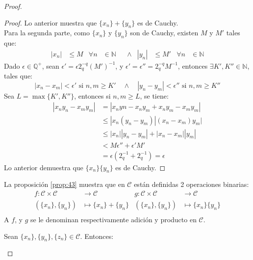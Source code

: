 \begin{proof}
\begin{proof}
  Lo anterior muestra que $\{x_n\} + \{y_n\}$ es de Cauchy.\\
  Para la segunda parte, como $\{x_n\}$ y $\{y_n\}$ son de Cauchy, existen $M$
  y $M'$ tales que:
  \begin{align*}
    |x_n| &\leq M & \forall n &\in \mathbb{N} & &\land & |y_n| &\leq M' &
    \forall n &\in \mathbb{N}
  \end{align*}
  Dado $\epsilon \in \mathbb{Q}^+$, sean $\epsilon' = \epsilon
  2_q^{-q}(M')^{-1}$, y  $\epsilon' = \epsilon''=  2_q^{-q}M^{-1}$, entonces
  $\exists K', K'' \in \mathbb{N}$, tales que:
  \[
    |x_n-x_m| < \epsilon' \mbox{ si } n,m \geq K' \quad \land \quad |y_n-y_m| <
    \epsilon'' \mbox{ si } n,m \geq K''
  \]
  Sea $L = \max \{ K', K''\}$, entonces si $n,m \geq L$, se tiene:
  \begin{align*}
    |x_ny_n -x_my_m| &= |x_nyn-x_ny_m +x_ny_m -x_my_m| \\
                     &\leq |x_n(y_n-y_m)|(x_n-x_m)y_m| \\
                     &\leq |x_n||y_n-y_m| + |x_n -x_m||y_m| \\
                     &< M\epsilon'' + \epsilon'M' \\
                     &=\epsilon(2_q^{-1} + 2_q^{-1}) = \epsilon
  \end{align*}
  Lo anterior demuestra que $\{x_n\}\{y_n\}$ es de Cauchy.
\end{proof}
\begin{definition}
  La proposición \eqref{prop:43} muestra que en $\mathcal{C}$ están definidas
  2 operaciones binarias:
  \begin{align*}
    f: \mathcal{C} \times \mathcal{C} &\to \mathcal{C} & g: \mathcal{C}
    \times \mathcal{C} &\to \mathcal{C} \\
    (\{x_n\},\{y_n\}) &\mapsto \{x_n\} + \{y_n\} &
    (\{x_n\},\{y_n\}) &\mapsto \{x_n\}\{y_n\} \\
  \end{align*}
  A $f$, y $g$ se le denominan respectivamente adición y producto en
  $\mathcal{C}$.
\end{definition}
\begin{proposition}\label{prop:44}
  Sean $\{x_n\}, \{y_n\}, \{z_n\} \in \mathcal{C}$. Entonces:
\end{proposition}
\end{proof}
